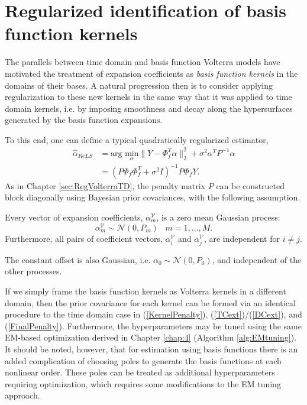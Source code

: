 \section{Regularized identification of basis function kernels}
\label{RegBFs_Chap5}

The parallels between time domain and basis function Volterra models have motivated the treatment of expansion coefficients as \emph{basis function kernels} in the domains of their bases.  A natural progression then is to consider applying regularization to these new kernels in the same way that it was applied to time domain kernels, i.e. by imposing smoothness and decay along the hypersurfaces generated by the basis function expansions.

To this end, one can define a typical quadratically regularized estimator, 
\begin{align}
\label{ReBF}
\hat{\alpha}_{ReLS} &= \text{arg } \underset{\alpha}{\text{min}} \|Y - \Phi_{f}^T \alpha \|^2_2 + \sigma^2 \alpha^T P^{-1} \alpha \\
&= (P \Phi_f \Phi_f^T + \sigma^2 I)^{-1} P \Phi_f Y.
\label{eq:ReBFanalytic}
\end{align}  
As in Chapter \ref{sec:RegVolterraTD}, the penalty matrix $P$ can be constructed block diagonally using Bayesian prior covariances, with the following assumption. 
\begin{assum}
Every vector of expansion coefficients, $\alpha_m^\mathcal{V}$, is a zero mean Gaussian process: 
\begin{equation}
\alpha_m^\mathcal{V} \sim \mathcal{N}(0,P_m) \; \; \; m = 1, \hdots, M.
\end{equation}
Furthermore, all pairs of coefficient vectors, $\alpha_i^\mathcal{V}$ and $\alpha_j^\mathcal{V}$, are independent for $i \neq j$.

The constant offset is also Gaussian, i.e. $\alpha_0 \sim \mathcal{N}(0,P_0)$, and independent of the other processes.
\end{assum}

If we simply frame the basis function kernels as Volterra kernels in a different domain, then the prior covariance for each kernel can be formed via an identical procedure to the time domain case in (\ref{KernelPenalty}), (\ref{TCext})/(\ref{DCext}), and (\ref{FinalPenalty}). Furthermore, the hyperparameters may be tuned using the same EM-based optimization derived in Chapter \ref{chap:4} (Algorithm \ref{alg:EMtuning}). It should be noted, however, that for estimation using basis functions there is an added complication of choosing poles to generate the basis functions at each nonlinear order. These poles can be treated as additional hyperparameters requiring optimization, which requires some modifications to the EM tuning approach.  

